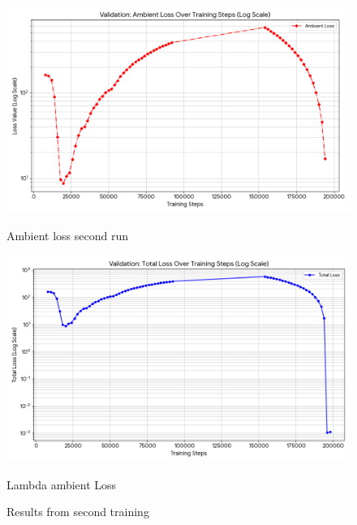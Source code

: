 \documentclass[12pt]{article}
\begin{document}
\begin{figure}[h!]
    \centering
    \begin{minipage}{0.45\textwidth}
        \centering
        \includegraphics[width=0.8\linewidth]{images/ambient_loss_v2.png}
        \caption{Ambient loss second run}
        \label{fig:ambient_loss_v2}
    \end{minipage}\hfill
    \begin{minipage}{0.45\textwidth}
        \centering
        \includegraphics[width=0.8\linewidth]{images/total_loss_v2.png}
        \caption{Lambda ambient Loss}
        \label{fig:total_loss_v2}
    \end{minipage}
    \caption{Results from second training}
    \label{fig:second-training}
\end{figure}
\end{document}
